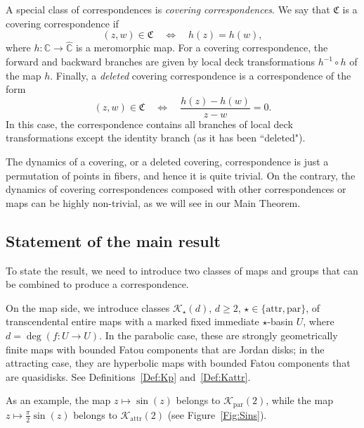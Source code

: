 \documentclass[11pt,a4paper, oneside]{amsart}
\theoremstyle{definition}
\theoremstyle{remark}
\numberwithin{equation}{section}
\renewcommand{\ge}{\geqslant}
\newcommand{\frakC}{\mathfrak{C}}
\newcommand{\Kstar}{{\mathscr K_\star}}
\newcommand{\parab}{{\text{par}}}
\newcommand{\attr}{{\text{attr}}}
\newcommand{\C}{\mathbb{C}}
\newcommand{\K}{\mathscr{K}}
\newcommand{\Cc}{\widehat{{\C}}}
\begin{document}
A special class of correspondences is \emph{covering correspondences}. We say that $\mathfrak C$ is a {covering correspondence} if 
\[
(z,w) \in \frakC \quad \Longleftrightarrow \quad h(z)=h(w),
\]
where $h \colon \C \to \Cc$ is a meromorphic map. For a covering correspondence, the forward and backward branches are given by local deck transformations $h^{-1} \circ h$ of the map $h$. Finally, a \emph{deleted} covering correspondence is a correspondence of the form
\[
(z,w) \in \frakC \quad \Longleftrightarrow \quad \frac{h(z)-h(w)}{z-w}=0.
\]
In this case, the correspondence contains all branches of local deck transformations except the identity branch (as it has been ``deleted"). 

The dynamics of a covering, or a deleted covering, correspondence is just a permutation of points in fibers, and hence it is quite trivial. On the contrary, the dynamics of covering correspondences composed with other correspondences or maps can be highly non-trivial, as we will see in our Main Theorem. 

\subsection{Statement of the main result}

To state the result, we need to introduce two classes of maps and groups that can be combined to produce a correspondence.

On the map side, we introduce classes $\Kstar(d)$, $d\ge2$, $\star\in\{\attr,\parab\}$, of transcendental entire maps with a marked fixed immediate $\star$-basin $U$, where $d=\deg(f\colon U\to U)$. In the parabolic case, these are strongly geometrically finite maps with bounded Fatou components that are Jordan disks; in the attracting case, they are hyperbolic maps with bounded Fatou components that are quasidisks. See Definitions~\ref{Def:Kp} and~\ref{Def:Kattr}.

As an example, the map $z \mapsto \sin(z)$ belongs to $\K_\parab(2)$, while the map $z \mapsto \frac{\pi}{2}\sin(z)$ belongs to $\K_\attr(2)$ (see Figure~\ref{Fig:Sins}). 
\end{document}
